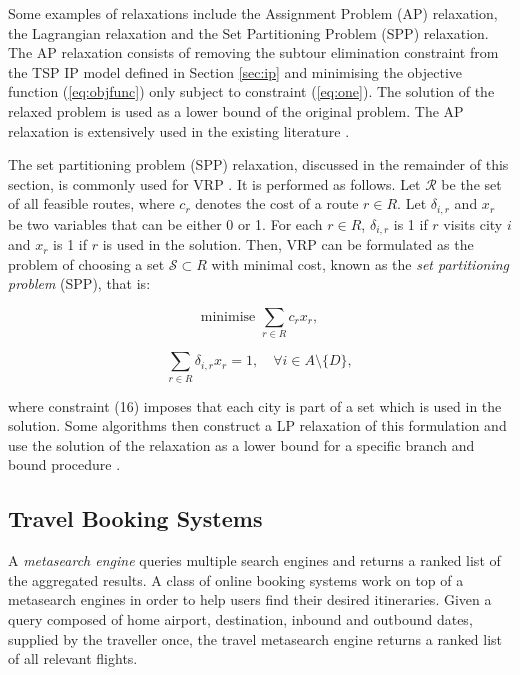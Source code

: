 \documentclass{mpaper}
\begin{document}
Some examples of relaxations include the Assignment Problem (AP) relaxation, the Lagrangian relaxation and the Set Partitioning Problem (SPP) relaxation. The AP relaxation consists of removing the subtour elimination constraint from the TSP IP model defined in Section \ref{sec:ip} and minimising the objective function (\ref{eq:objfunc}) only subject to constraint (\ref{eq:one}). The solution of the relaxed problem is used as a lower bound of the original problem. The AP relaxation is extensively used in the existing literature \cite{Fischetti92,Jonker80,Eastman58,Laporte86}.

The set partitioning problem (SPP) relaxation, discussed in the remainder of this section, is commonly used for VRP \citep{Desrochers92,Agarwal89,Desrosiers84,Alvarenga07}. It is performed as follows. Let $\mathcal{R}$ be the set of all feasible routes, where $c_{r}$ denotes the cost of a route $r \in R$. Let $\delta_{i,r}$ and $x_{r}$ be two variables that can be either 0 or 1. For each $r \in R$, $\delta_{i,r}$ is 1 if $r$ visits city $i$ and $x_{r}$ is 1 if $r$ is used in the solution. Then, VRP can be formulated as the problem of choosing a set $\mathcal{S} \subset R$ with minimal cost, known as the \textit{set partitioning problem} (SPP), that is:

\vspace{-1mm}
\begin{equation}
\label{eq:tcvrpobjfunc}
\textrm{minimise } \sum_{r \in R} c_{r} x_{r},
\end{equation}
\vspace{-3mm}

\begin{equation}
\label{eq:tcvrpconstraint1}
\sum_{r \in R} \delta_{i,r} x_{r} = 1, \quad \forall i \in A \setminus \{D\},
\end{equation}
\vspace{-1mm}

where constraint (16) imposes that each city is part of a set which is used in the solution. Some algorithms then construct a LP relaxation of this formulation and use the solution of the relaxation as a lower bound for a specific branch and bound procedure \citep{Desrochers92,Agarwal89}.



\subsection{Travel Booking Systems}
\label{sec:metasearchengines} 
A \textit{metasearch engine} queries multiple search engines and returns a ranked list of the aggregated results. A class of online booking systems work on top of a metasearch engines in order to help users find their desired itineraries. Given a query composed of home airport, destination, inbound and outbound dates, supplied by the traveller once, the travel metasearch engine returns a ranked list of all relevant flights.
\end{document}
